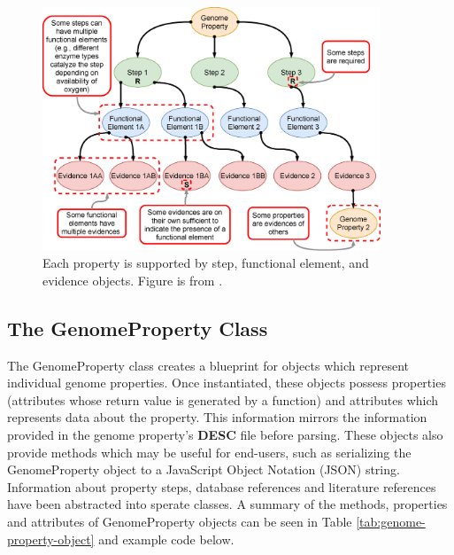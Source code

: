 \begin{figure}[!ht]
  \centering
	\includegraphics[width=0.90\textwidth]{media/Figure_1B.eps}
	 \caption{Each property is supported by step, functional element, and evidence objects. Figure is from \cite{bergstrand2019pygenprop}.}
	 \label{fig:property}
\end{figure}

\subsection{The GenomeProperty Class}

The GenomeProperty class creates a blueprint for objects which represent individual genome properties. Once instantiated, these objects possess properties (attributes whose return value is generated by a function) and attributes which represents data about the property. This information mirrors the information provided in the genome property's \textbf{DESC} file before parsing. These objects also provide methods which may be useful for end-users, such as serializing the GenomeProperty object to a JavaScript Object Notation (JSON) \cite{bray2014rfc} string. Information about property steps, database references and literature references have been abstracted into sperate classes. A summary of the methods, properties and attributes of GenomeProperty objects can be seen in Table \ref{tab:genome-property-object} and example code below.

